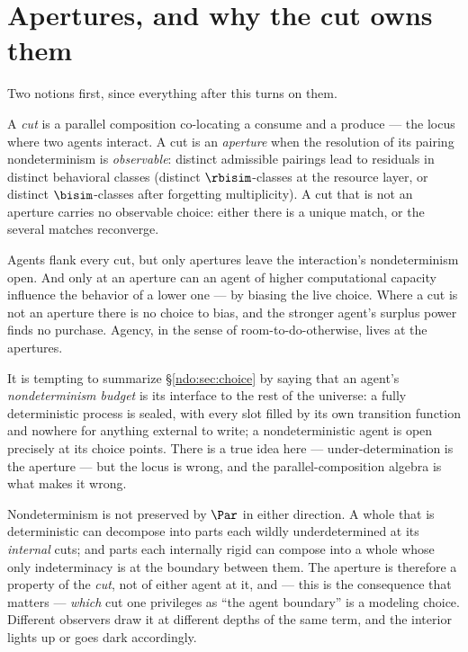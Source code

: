 \section{Apertures, and why the cut owns them}\label{ndo:sec:aperture}

Two notions first, since everything after this turns on them.

\begin{definition}\label{ndo:def:aperture}
A \emph{cut} is a parallel composition co-locating a consume and a produce --- the
locus where two agents interact. A cut is an \emph{aperture} when the resolution of
its pairing nondeterminism is \emph{observable}: distinct admissible pairings lead to
residuals in distinct behavioral classes (distinct $\rbisim$-classes at the resource
layer, or distinct $\bisim$-classes after forgetting multiplicity). A cut that is not
an aperture carries no observable choice: either there is a unique match, or the
several matches reconverge.
\end{definition}

\begin{principle}\label{ndo:prin:main}
Agents flank every cut, but only apertures leave the interaction's nondeterminism
open. And only at an aperture can an agent of higher computational capacity influence
the behavior of a lower one --- by biasing the live choice. Where a cut is not an
aperture there is no choice to bias, and the stronger agent's surplus power finds no
purchase. Agency, in the sense of room-to-do-otherwise, lives at the apertures.
\end{principle}


It is tempting to summarize \S\ref{ndo:sec:choice} by saying that an agent's
\emph{nondeterminism budget} is its interface to the rest of the universe: a
fully deterministic process is sealed, with every slot filled by its own
transition function and nowhere for anything external to write; a
nondeterministic agent is open precisely at its choice points. There is a true
idea here --- under-determination is the aperture --- but the locus is wrong, and
the parallel-composition algebra is what makes it wrong.

Nondeterminism is not preserved by $\Par$ in either direction. A whole that is
deterministic can decompose into parts each wildly underdetermined at its
\emph{internal} cuts; and parts each internally rigid can compose into a whole
whose only indeterminacy is at the boundary between them. The aperture is
therefore a property of the \emph{cut}, not of either agent at it, and --- this is
the consequence that matters --- \emph{which} cut one privileges as ``the agent
boundary'' is a modeling choice. Different observers draw it at different depths
of the same term, and the interior lights up or goes dark accordingly.

